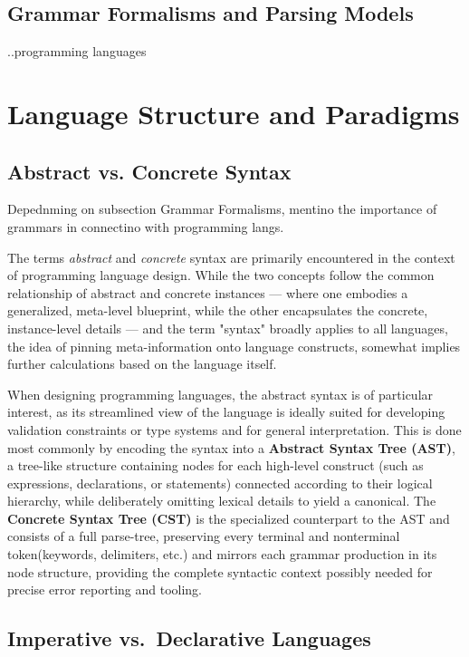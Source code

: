\documentclass[11pt]{report}
\begin{document}
\subsection{Grammar Formalisms and Parsing Models}
..programming languages

\section{Language Structure and Paradigms}
\subsection{Abstract vs. Concrete Syntax}
Depednming on subsection Grammar Formalisms, mentino the importance of grammars in connectino with programming langs.

The terms \textit{abstract} and \textit{concrete} syntax are primarily encountered in the context of programming language design. While the two concepts follow the common relationship of
abstract and concrete instances — where one embodies a generalized, meta-level blueprint, while the other encapsulates the concrete, instance-level details — and the term "syntax" broadly applies to all languages,
the idea of pinning meta-information onto language constructs, somewhat implies further calculations based on the language itself.


When designing programming languages, the abstract syntax is of particular interest, as its streamlined view of the language is ideally suited for developing 
validation constraints or type systems and for general interpretation. This is done most commonly by encoding the syntax into a \textbf{Abstract Syntax Tree (AST)}, 
a tree-like structure containing nodes for each high-level construct (such as expressions, declarations, or statements) connected according to their logical hierarchy, 
while deliberately omitting lexical details to yield a canonical. \cite{slonneger1995specifying}
The \textbf{Concrete Syntax Tree (CST)} is the specialized counterpart to the AST and consists of a full parse-tree, preserving every terminal and nonterminal 
token(keywords, delimiters, etc.) and mirrors each grammar production in its node structure, providing the complete syntactic context possibly needed for precise error 
reporting and tooling. \cite{aho2006compilers}

\subsection{Imperative vs.\ Declarative Languages}
\end{document}
